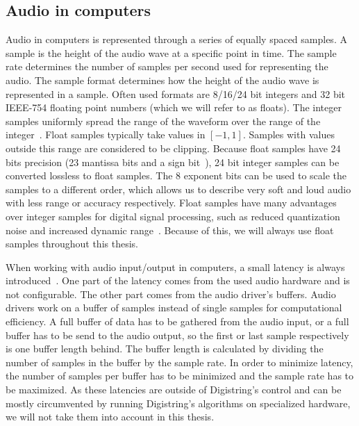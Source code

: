 \documentclass[a4paper,10pt,twocolumn]{article}
\begin{document}
\subsection{Audio in computers}  \label{sub:computer_audio}
Audio in computers is represented through a series of equally spaced samples. A sample is the height of the audio wave at a specific point in time. The sample rate determines the number of samples per second used for representing the audio. The sample format determines how the height of the audio wave is represented in a sample. Often used formats are 8/16/24 bit integers and 32 bit IEEE-754 floating point numbers (which we will refer to as floats). The integer samples uniformly spread the range of the waveform over the range of the integer~\cite{dspfloat}. Float samples typically take values in $[-1, 1]$. Samples with values outside this range are considered to be clipping. Because float samples have 24 bits precision (23 mantissa bits and a sign bit~\cite{ieeefloat}), 24 bit integer samples can be converted lossless to float samples. The 8 exponent bits can be used to scale the samples to a different order, which allows us to describe very soft and loud audio with less range or accuracy respectively. Float samples have many advantages over integer samples for digital signal processing, such as reduced quantization noise and increased dynamic range~\cite{dspfloat}. Because of this, we will always use float samples throughout this thesis.

When working with audio input/output in computers, a small latency is always introduced~\cite{presonus}. One part of the latency comes from the used audio hardware and is not configurable. The other part comes from the audio driver's buffers. Audio drivers work on a buffer of samples instead of single samples for computational efficiency. A full buffer of data has to be gathered from the audio input, or a full buffer has to be send to the audio output, so the first or last sample respectively is one buffer length behind. The buffer length is calculated by dividing the number of samples in the buffer by the sample rate. In order to minimize latency, the number of samples per buffer has to be minimized and the sample rate has to be maximized. As these latencies are outside of Digistring's control and can be mostly circumvented by running Digistring's algorithms on specialized hardware, we will not take them into account in this thesis.
\end{document}
